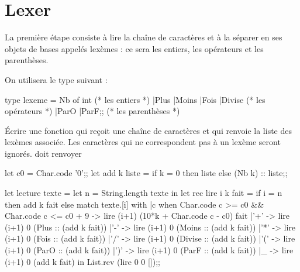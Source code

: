 \section{Lexer}
La première étape consiste à lire la chaîne de caractères et à la séparer en ses objets de bases appelés lexèmes : ce sera les entiers, les opérateurs et les parenthèses.

On utilisera le type suivant :
\begin{ocaml}
type lexeme =  Nb of int (* les entiers *)
              |Plus |Moins |Fois |Divise (* les opérateurs *)
              |ParO |ParF;; (* les parenthèses *)
\end{ocaml}
\begin{question}{}{} 
Écrire une fonction  qui reçoit une chaîne de caractères et qui renvoie la liste des lexèmes associée. Les caractères qui ne correspondent pas à un lexème seront ignorés.
 doit renvoyer
\begin{ocaml}
\end{ocaml}

\reponse

\begin{ocaml}
let c0 = Char.code '0';;
let add k liste =
    if k = 0 
    then liste
    else (Nb k) :: liste;;

let lecture texte =
   let n = String.length texte in
   let rec lire i k fait =
      if i = n
      then add k fait
      else match texte.[i] with
           |c when Char.code c >= c0 && Char.code c <= c0 + 9
                -> lire (i+1) (10*k + Char.code c - c0) fait
           |'+' -> lire (i+1) 0 (Plus   :: (add k fait))
           |'-' -> lire (i+1) 0 (Moins  :: (add k fait))
           |'*' -> lire (i+1) 0 (Fois   :: (add k fait))
           |'/' -> lire (i+1) 0 (Divise :: (add k fait))
           |'(' -> lire (i+1) 0 (ParO   :: (add k fait))
           |')' -> lire (i+1) 0 (ParF   :: (add k fait))
           |_   -> lire (i+1) 0 (add k fait) in
   List.rev (lire 0 0 []);;

\end{ocaml}
\end{question}
